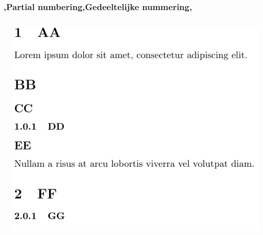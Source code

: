 \begin{frame}
    \frametitle{\lang,Partial numbering,Gedeeltelijke nummering,}
    
    \begin{columns}
        \begin{column}{0.5\textwidth}
        \end{column}
        \begin{column}{0.5\textwidth}
            \includegraphics[width=\linewidth,height=0.8\textheight,keepaspectratio]{assets/partialNumberedStars.pdf}
        \end{column}
    \end{columns}
\end{frame}
